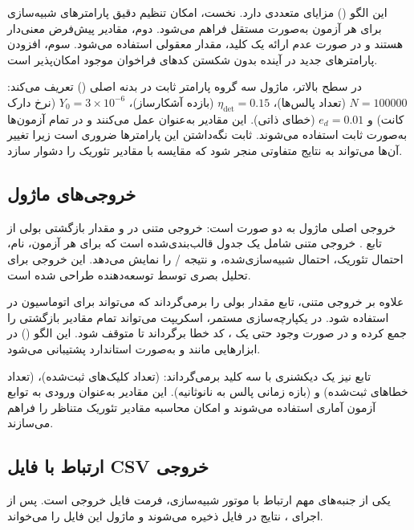 این الگو () مزایای متعددی دارد. نخست، امکان تنظیم دقیق پارامترهای شبیه‌سازی برای هر آزمون به‌صورت مستقل فراهم می‌شود. دوم، مقادیر پیش‌فرض معنی‌دار هستند و در صورت عدم ارائه یک کلید، مقدار معقولی استفاده می‌شود. سوم، افزودن پارامترهای جدید در آینده بدون شکستن کدهای فراخوان موجود امکان‌پذیر است.

در سطح بالاتر، ماژول سه گروه پارامتر ثابت در بدنه اصلی () تعریف می‌کند: $N = 100000$ (تعداد پالس‌ها)، $\eta_{\text{det}} = 0.15$ (بازده آشکارساز)، $Y_0 = 3 \times 10^{-6}$ (نرخ دارک کانت) و $e_d = 0.01$ (خطای ذاتی). این مقادیر به‌عنوان  عمل می‌کنند و در تمام آزمون‌ها به‌صورت ثابت استفاده می‌شوند. ثابت نگه‌داشتن این پارامترها ضروری است زیرا تغییر آن‌ها می‌تواند به نتایج متفاوتی منجر شود که مقایسه با مقادیر تئوریک را دشوار سازد.

\subsection{خروجی‌های ماژول}

خروجی اصلی ماژول به دو صورت است: خروجی متنی در  و مقدار بازگشتی بولی از تابع . خروجی متنی شامل یک جدول قالب‌بندی‌شده است که برای هر آزمون، نام، احتمال تئوریک، احتمال شبیه‌سازی‌شده،  و نتیجه / را نمایش می‌دهد. این خروجی برای تحلیل بصری توسط توسعه‌دهنده طراحی شده است.

علاوه بر خروجی متنی، تابع  مقدار بولی  را برمی‌گرداند که می‌تواند برای اتوماسیون در  استفاده شود. در یکپارچه‌سازی مستمر، اسکریپت می‌تواند تمام مقادیر بازگشتی را جمع کرده و در صورت وجود حتی یک ، کد خطا برگرداند تا  متوقف شود. این الگو () در ابزارهایی مانند  و  به‌صورت استاندارد پشتیبانی می‌شود.

تابع  نیز یک دیکشنری با سه کلید برمی‌گرداند:  (تعداد کلیک‌های ثبت‌شده)،  (تعداد خطاهای ثبت‌شده) و  (بازه زمانی پالس به نانوثانیه). این مقادیر به‌عنوان ورودی به توابع آزمون آماری استفاده می‌شوند و امکان محاسبه مقادیر تئوریک متناظر را فراهم می‌سازند.

\subsection{ارتباط با فایل CSV خروجی}

یکی از جنبه‌های مهم ارتباط با موتور شبیه‌سازی، فرمت فایل  خروجی است. پس از اجرای ، نتایج در فایل  ذخیره می‌شوند و ماژول  این فایل را می‌خواند.

